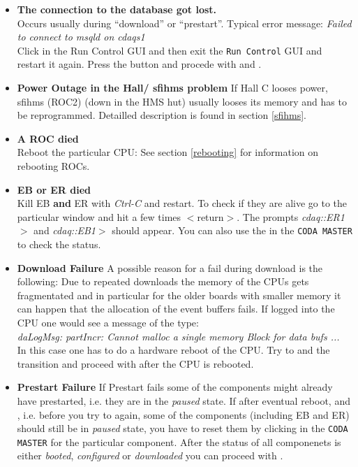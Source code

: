 \begin{itemize}

\item {\bf The connection to the database got lost.}\\
Occurs usually during ``download'' or ``prestart''.
Typical error message: {\em Failed to connect to msqld on cdaqs1}\\
Click  in the Run Control GUI and then exit the 
\verb|Run Control| GUI and restart it again. Press the 
 button and procede with  and 
.

\item {\bf Power Outage in the Hall/ sfihms problem}
If Hall C looses power, sfihms (ROC2) (down in the HMS hut) usually looses 
its memory 
and has to be reprogrammed. Detailled description is found in section 
\ref{sfihms}.  

\item {\bf A ROC died}\\
Reboot the particular CPU:  See section \ref{rebooting} for information on
rebooting ROCs.

\item {\bf EB or ER died}\\
Kill EB {\bf and} ER with {\em Ctrl-C} and restart.
To check if they are alive go to the particular 
window and hit a few times $<$return$>$. The prompts
{\em cdaq::ER1$>$} and {\em cdaq::EB1$>$} should appear. You can also use the 
 in the \verb|CODA MASTER| to check the status.

\item {\bf Download Failure} A possible reason for a fail during download
is the following:
Due to repeated downloads the memory of 
the CPUs gets fragmentated and in particular for the older boards with 
smaller memory it can happen that the allocation of the event buffers 
fails. 
If logged into the CPU one would see a message of the type:\\
{\em daLogMsg: partIncr: Cannot malloc a single memory Block for 
data bufs ...}\\ 
In this case one has to do a hardware reboot of the CPU.
Try to  and  the transition and proceed with 
 after the CPU is rebooted.

\item{\bf Prestart Failure} If Prestart fails some of the components 
might already have prestarted, i.e. they are in the {\em paused} state.
If after eventual reboot,  and , 
i.e. before you try to 
 again, some of the components (including EB 
and ER) should still be in {\em paused} state, you have to 
reset them by clicking  in the \verb|CODA MASTER| for the 
particular component. After the status of all componenets is either 
{\em booted}, {\em configured} or {\em downloaded} you can proceed with 
.


\end{itemize}
